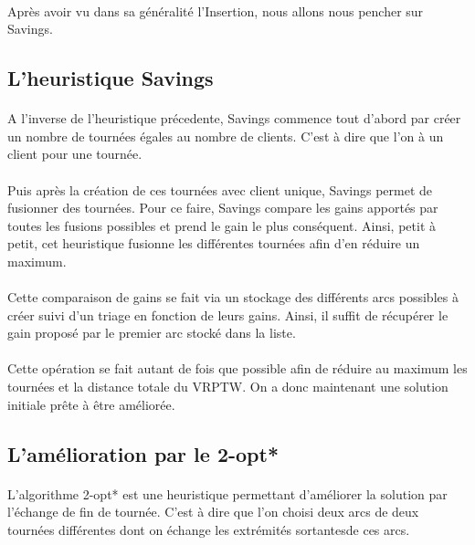 \documentclass[12pt]{article}
\begin{document}
\paragraph{}
Après avoir vu dans sa généralité l'Insertion, nous allons nous pencher sur Savings.

\subsection{L'heuristique Savings}

\paragraph{}
A l'inverse de l'heuristique précedente, Savings commence tout d'abord par créer un nombre de tournées égales au nombre de clients. C'est à dire que l'on à un 
client pour une tournée.

\paragraph{}
Puis après la création de ces tournées avec client unique, Savings permet de fusionner des tournées. Pour ce faire, Savings compare les gains apportés par 
toutes les fusions possibles et prend le gain le plus conséquent. Ainsi, petit à petit, cet heuristique fusionne les différentes tournées afin d'en 
réduire un maximum.

\paragraph{}
Cette comparaison de gains se fait via un stockage des différents arcs possibles à créer suivi d'un triage en fonction de leurs gains. Ainsi, il suffit de récupérer 
le gain proposé par le premier arc stocké dans la liste.

\paragraph{}
Cette opération se fait autant de fois que possible afin de réduire au maximum les tournées et la distance totale du VRPTW. On a donc maintenant une solution 
initiale prête à être améliorée.

\subsection{L'amélioration par le 2-opt*}

\paragraph{}
L'algorithme 2-opt* est une heuristique permettant d'améliorer la solution par l'échange de fin de tournée. C'est à dire que l'on choisi deux arcs de deux 
tournées différentes dont on échange les extrémités sortantesde ces arcs.
\end{document}

